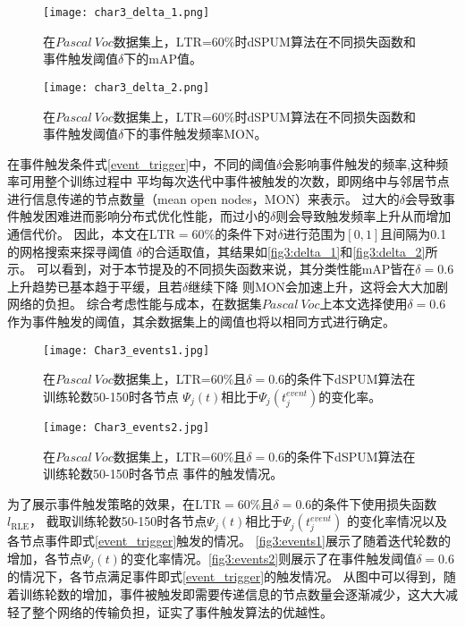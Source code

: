 \begin{figure}[htbp]
    \centering
    \texttt{[image: char3\_delta\_1.png]}
    \caption{\label{fig3:delta_1}{在$Pascal~Voc$数据集上，$\text{LTR=60\%}$时dSPUM算法在不同损失函数和事件触发阈值$\delta$下的mAP值。}}
\end{figure}
\begin{figure}[htbp]
    \centering
    \texttt{[image: char3\_delta\_2.png]}
    \caption{\label{fig3:delta_2}{在$Pascal~Voc$数据集上，$\text{LTR=60\%}$时dSPUM算法在不同损失函数和事件触发阈值$\delta$下的事件触发频率MON。}}
\end{figure}
在事件触发条件式\eqref{event_trigger}中，不同的阈值$\delta$会影响事件触发的频率,这种频率可用整个训练过程中
平均每次迭代中事件被触发的次数，即网络中与邻居节点进行信息传递的节点数量（mean open nodes，MON）来表示。
过大的$\delta$会导致事件触发困难进而影响分布式优化性能，而过小的$\delta$则会导致触发频率上升从而增加通信代价。
因此，本文在$\mathrm{LTR=60\%}$的条件下对$\delta$进行范围为$\left[0,1\right]$且间隔为0.1的网格搜索来探寻阈值
$\delta$的合适取值，其结果如\autoref{fig3:delta_1}和\autoref{fig3:delta_2}所示。
可以看到，对于本节提及的不同损失函数来说，其分类性能mAP皆在$\delta=0.6$上升趋势已基本趋于平缓，且若$\delta$继续下降
则MON会加速上升，这将会大大加剧网络的负担。
综合考虑性能与成本，在数据集$Pascal~Voc$上本文选择使用$\delta=0.6$作为事件触发的阈值，其余数据集上的阈值也将以相同方式进行确定。

\begin{figure}[htbp]
    \centering
    \texttt{[image: Char3\_events1.jpg]}
    \caption{\label{fig3:events1}在$Pascal~Voc$数据集上，LTR=60\%且$\delta=0.6$的条件下dSPUM算法在训练轮数50-150时各节点
    $\boldsymbol\varPsi_j\left(t\right)$相比于$\boldsymbol\varPsi_j\left(t_j^{event}\right)$的变化率。}
\end{figure}
\begin{figure}[htbp]
    \centering
    \texttt{[image: Char3\_events2.jpg]}
    \caption{\label{fig3:events2}在$Pascal~Voc$数据集上，LTR=60\%且$\delta=0.6$的条件下dSPUM算法在训练轮数50-150时各节点
    事件的触发情况。}
\end{figure}
为了展示事件触发策略的效果，在$\mathrm{LTR=60\%}$且$\delta=0.6$的条件下使用损失函数$l_{\mathrm{RLE}}$，
截取训练轮数50-150时各节点$\boldsymbol\varPsi_j\left(t\right)$相比于$\boldsymbol\varPsi_j\left(t_j^{event}\right)$
的变化率情况以及各节点事件即式\eqref{event_trigger}触发的情况。 
\autoref{fig3:events1}展示了随着迭代轮数的增加，各节点$\boldsymbol\varPsi_j\left(t\right)$的变化率情况。\autoref{fig3:events2}则展示了在事件触发阈值$\delta=0.6$的情况下，各节点满足事件即式\eqref{event_trigger}的触发情况。
从图中可以得到，随着训练轮数的增加，事件被触发即需要传递信息的节点数量会逐渐减少，这大大减轻了整个网络的传输负担，证实了事件触发算法的优越性。

